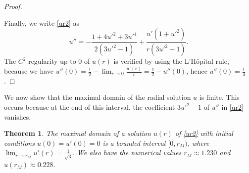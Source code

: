 \documentclass[preprint,11pt]{elsarticle}
\newtheorem{theorem}{Theorem}[section]
\theoremstyle{definition}
\begin{document}
\begin{proof}
\begin{enumerate}
\end{enumerate}
 Finally, we write \eqref{ur2} as
 \begin{equation}\label{ur3}
 u''=-\frac{1+4u'^2+3u'^4}{2(3u'^2-1)} +\frac{u'(1+u'^2)}{r (3u'^2-1)}.
 \end{equation}
 The $C^2$-regularity up to $0$ of $u(r)$ is verified by using the  L'H\^{o}pital  rule, because we have $u''(0)=\frac12-\lim_{r\to 0}\frac{u'(r)}{r}=\frac12-u''(0)$, 
hence $u''(0)=\frac14$. 
\end{proof}

  We now show that the maximal domain of the radial solution $u$ is finite. This occurs because at the end of this interval, the coefficient $3u'^2-1$ of $u''$ in \eqref{ur2}   vanishes.

 
\begin{theorem}\label{t2} The maximal domain of a solution $u(r)$ of \eqref{ur2} with initial conditions $u(0)=u'(0)=0$ is   a bounded interval    $[0,r_M)$, where   $\lim_{r\to r_M}u'(r)=\frac{1}{\sqrt{3}}$. We also have the numerical values $r_M\approx 1.230$ and $u(r_M)\approx 0.228$.
\end{theorem}
\end{document}
